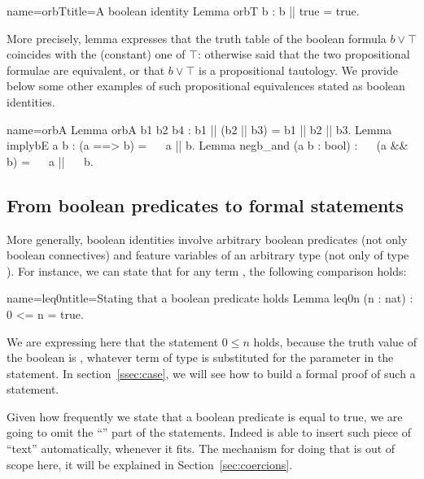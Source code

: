 \begin{coq}{name=orbT}{title=A boolean identity}
Lemma orbT b : b || true = true.
\end{coq}


More precisely, lemma 
expresses that the truth table of the boolean formula $b \vee \top$
coincides with the (constant) one of $\top$: otherwise said that the
two propositional formulae are equivalent, or that $b \vee \top$ is a
propositional tautology. We provide below some other examples of such
propositional equivalences stated as boolean identities.

\begin{coq}{name=orbA}{}
Lemma orbA b1 b2 b4 : b1 || (b2 || b3) = b1 || b2 || b3.
Lemma implybE a b : (a ==> b) = ~~ a || b.
Lemma negb_and (a b : bool) : ~~ (a && b) = ~~ a || ~~ b.
\end{coq}



\subsection{From boolean predicates to formal statements}

More generally, boolean identities involve arbitrary boolean
predicates (not only boolean connectives) and feature variables of
an arbitrary type (not only of type ).
 For instance, we can state
that for any term , the following comparison holds:

\begin{coq}{name=leq0n}{title=Stating that a boolean predicate holds}
Lemma leq0n (n : nat) : 0 <= n = true.
\end{coq}
We are expressing here that the statement $0 \leq n$ holds, because
the truth value of the boolean  is , whatever
term  of type  is substituted for the parameter  in the
statement. In section~\ref{ssec:case}, we will see how to build a
formal proof of such a statement.

Given how frequently we state that a boolean predicate is
equal to true, we are going to omit the ``''
part of the statements.  Indeed \Coq{} is able to insert such
piece of ``text'' automatically, whenever it fits.
The \Coq{} mechanism for doing that is out of scope here, it 
will be explained in Section~\ref{sec:coercions}.

